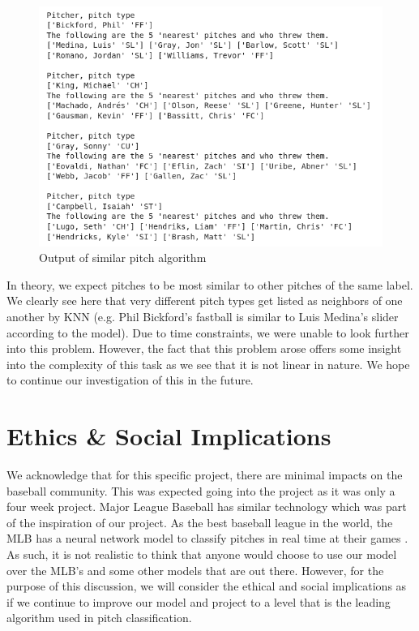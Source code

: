 \documentclass{article}
\begin{document}
\begin{center}
  \begin{figure} [h!]
    \includegraphics[scale = .35]{GroupSimPitch.png}
    \caption{Output of similar pitch algorithm}
  \end{figure}
\end{center}

In theory, we expect pitches to be most similar to other pitches of the same label. We clearly see here that 
very different pitch types get listed as neighbors of one another by KNN (e.g. Phil Bickford's fastball is 
similar to Luis Medina's slider according to the model). Due to time constraints, we were unable to look 
further into this problem. However, the fact that this problem arose offers some insight into the complexity 
of this task as we see that it is not linear in nature. We hope to continue our investigation of this in 
the future.

\section{Ethics \& Social Implications}
\label{ethics}
We acknowledge that for this specific project, there are minimal impacts on the baseball community. This 
was expected going into the project as it was only a four week project. Major League Baseball has similar 
technology which was part of the inspiration of our project. As the best baseball league in the world, 
the MLB has a neural network model to classify pitches in real time at their games \cite{Sharpe_Schwartz_2020}. 
As such, it is not realistic to think that anyone would choose to use our model over the MLB's and some 
other models that are out there. However, for the purpose of this discussion, we will consider the ethical 
and social implications as if we continue to improve our model and project to a level that is the leading 
algorithm used in pitch classification.
\end{document}
